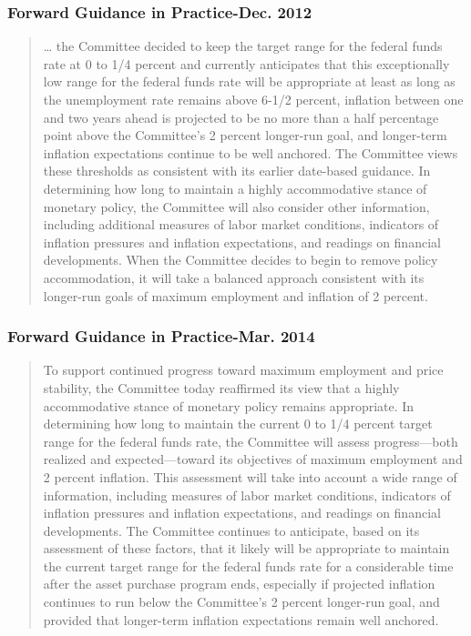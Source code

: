 \documentclass{beamer}
\begin{document}
\begin{frame}
\frametitle[alignment=center]{Forward Guidance in Practice-Dec. 2012}
\footnotesize
\begin{quote}
 … the Committee decided to keep the target range for the federal funds rate at 0 to 1/4 percent and currently anticipates that this exceptionally low range for the federal funds rate will be appropriate at least as long as the unemployment rate remains above 6-1/2 percent, inflation between one and two years ahead is projected to be no more than a half percentage point above the Committee’s 2 percent longer-run goal, and longer-term inflation expectations continue to be well anchored. The Committee views these thresholds as consistent with its earlier date-based guidance. In determining how long to maintain a highly accommodative stance of monetary policy, the Committee will also consider other information, including additional measures of labor market conditions, indicators of inflation pressures and inflation expectations, and readings on financial developments. When the Committee decides to begin to remove policy accommodation, it will take a balanced approach consistent with its longer-run goals of maximum employment and inflation of 2 percent.
\end{quote}
\end{frame}


\begin{frame}
\frametitle[alignment=center]{Forward Guidance in Practice-Mar. 2014}
\footnotesize
\begin{quote}
To support continued progress toward maximum employment and price stability, the Committee today reaffirmed its view that a highly accommodative stance of monetary policy remains appropriate. In determining how long to maintain the current 0 to 1/4 percent target range for the federal funds rate, the Committee will assess progress—both realized and expected—toward its objectives of maximum employment and 2 percent inflation. This assessment will take into account a wide range of information, including measures of labor market conditions, indicators of inflation pressures and inflation expectations, and readings on financial developments. The Committee continues to anticipate, based on its assessment of these factors, that it likely will be appropriate to maintain the current target range for the federal funds rate for a considerable time after the asset purchase program ends, especially if projected inflation continues to run below the Committee’s 2 percent longer-run goal, and provided that longer-term inflation expectations remain well anchored.
\end{quote}
\end{frame}
\end{document}
